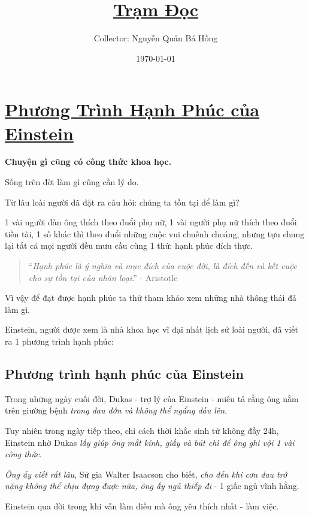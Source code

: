 \documentclass{book}
\title{\href{http://tramdoc.vn/}{Trạm Đọc}}
\author{Collector: Nguyễn Quản Bá Hồng}
\date{\today}
\numberwithin{equation}{section}
\begin{document}
\maketitle
\setcounter{secnumdepth}{6}
\setcounter{tocdepth}{6}
\tableofcontents


\chapter{\href{http://tramdoc.vn/tin-tuc/phuong-trinh-hanh-phuc-cua-einstein-nzGgvW.html}{Phương Trình Hạnh Phúc của Einstein}}

\textbf{Chuyện gì cũng có công thức khoa học.}

%
Sống trên đời làm gì cũng cần lý do.

Từ lâu loài người đã đặt ra câu hỏi: chúng ta tồn tại để làm gì?

1 vài người đàn ông thích theo đuổi phụ nữ, 1 vài người phụ nữ thích theo đuổi tiền tài, 1 số khác thì theo đuổi những cuộc vui chuếnh choáng, nhưng tựu chung lại tất cả mọi người đều mưu cầu cùng 1 thứ: hạnh phúc đích thực.
\begin{quotation}
    ``\textit{Hạnh phúc là ý nghĩa và mục đích của cuộc đời, là đích đến và kết cuộc cho sự tồn tại của nhân loại}.'' - Aristotle
\end{quotation}
Vì vậy để đạt được hạnh phúc ta thử tham khảo xem những nhà thông thái đã làm gì.

Einstein, người được xem là nhà khoa học vĩ đại nhất lịch sử loài người, đã viết ra 1 phương trình hạnh phúc:

\section{Phương trình hạnh phúc của Einstein}
Trong những ngày cuối đời, Dukas - trợ lý của Einstein - miêu tả rằng ông nằm trên giường bệnh \textit{trong đau đớn và không thể ngẩng đầu lên}.

%
Tuy nhiên trong ngày tiếp theo, chỉ cách thời khắc sinh tử không đầy 24h, Einstein nhờ Dukas \textit{lấy giúp ông mắt kính, giấy và bút chì để ông ghi vội 1 vài công thức}.

%
\textit{Ông ấy viết rất lâu}, Sử gia Walter Isaacson cho biết, \textit{cho đến khi cơn đau trở nặng không thể chịu đựng được nữa, ông ấy ngủ thiếp đi} - 1 giấc ngủ vĩnh hằng.

Einstein qua đời trong khi vẫn làm điều mà ông yêu thích nhất - làm việc.
\end{document}
